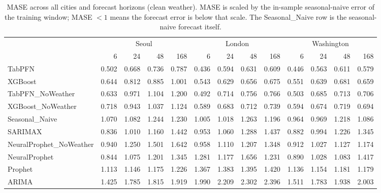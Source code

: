 \begin{table}[ht!]
\centering
\caption{MASE across all cities and forecast horizons (clean weather). MASE is scaled by the in-sample seasonal-naive error of the training window; MASE $< 1$ means the forecast error is below that scale. The Seasonal\_Naive row is the seasonal-naive forecast itself.}
\label{tab:mase_cross_city}
{\small\setlength{\tabcolsep}{3pt}\scriptsize
\begin{tabular}{lrrrrrrrrrrrr}
\toprule
 & \multicolumn{4}{c}{Seoul} & \multicolumn{4}{c}{London} & \multicolumn{4}{c}{Washington} \\
 & 6 & 24 & 48 & 168 & 6 & 24 & 48 & 168 & 6 & 24 & 48 & 168 \\
\midrule
TabPFN & 0.502 & 0.668 & 0.736 & 0.787 & 0.436 & 0.594 & 0.631 & 0.609 & 0.446 & 0.563 & 0.611 & 0.579 \\
XGBoost & 0.644 & 0.812 & 0.885 & 1.001 & 0.543 & 0.629 & 0.656 & 0.675 & 0.551 & 0.639 & 0.681 & 0.659 \\
TabPFN\_NoWeather & 0.633 & 0.971 & 1.104 & 1.200 & 0.492 & 0.714 & 0.756 & 0.766 & 0.503 & 0.685 & 0.713 & 0.706 \\
XGBoost\_NoWeather & 0.718 & 0.943 & 1.037 & 1.124 & 0.589 & 0.683 & 0.712 & 0.739 & 0.594 & 0.674 & 0.719 & 0.694 \\
Seasonal\_Naive & 1.070 & 1.082 & 1.244 & 1.230 & 1.005 & 1.018 & 1.263 & 1.196 & 0.964 & 0.969 & 1.218 & 1.086 \\
SARIMAX & 0.836 & 1.010 & 1.160 & 1.442 & 0.953 & 1.060 & 1.288 & 1.437 & 0.882 & 0.994 & 1.226 & 1.345 \\
NeuralProphet\_NoWeather & 0.940 & 1.250 & 1.501 & 1.642 & 0.958 & 1.110 & 1.207 & 1.348 & 0.912 & 1.027 & 1.127 & 1.174 \\
NeuralProphet & 0.844 & 1.075 & 1.201 & 1.345 & 1.281 & 1.177 & 1.656 & 1.231 & 0.890 & 1.028 & 1.083 & 1.417 \\
Prophet & 1.113 & 1.146 & 1.175 & 1.226 & 1.367 & 1.383 & 1.395 & 1.420 & 1.136 & 1.154 & 1.181 & 1.179 \\
ARIMA & 1.425 & 1.785 & 1.815 & 1.919 & 1.990 & 2.209 & 2.302 & 2.396 & 1.511 & 1.783 & 1.938 & 2.003 \\
\bottomrule
\end{tabular}
}
\end{table}
